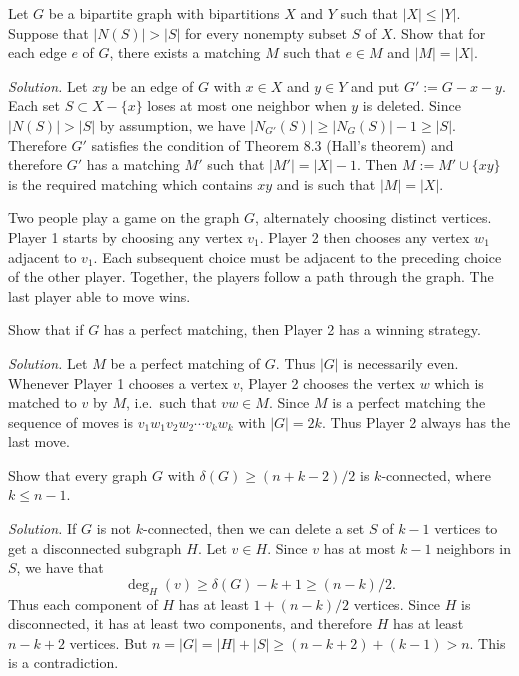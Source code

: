 \documentclass[10pt,reqno]{amsart}
\begin{document}
\begin{outline}[enumerate]
\medskip
\1 Let $G$ be a bipartite graph with bipartitions $X$ and $Y$ such that $|X|
\le |Y|$. Suppose that $|N(S)| > |S|$ for every nonempty subset $S$ of $X$.
Show that for each edge $e$ of $G$, there exists a matching $M$ such that $e\in
M$ and $|M| = |X|.$

\medskip
\noindent \emph{Solution.} Let $xy$ be an edge of $G$ with $x\in X$ and $y\in
Y$ and put $G' := G-x-y.$ Each set $S \subset X-\{x\}$ loses at most one
neighbor when $y$ is deleted. Since $|N(S)| > |S|$ by assumption, we have
$|N_{G'}(S)| \ge |N_G(S)|-1 \ge |S|.$ Therefore $G'$ satisfies the condition of
Theorem 8.3 (Hall's theorem) and therefore $G'$ has a matching $M'$ such that
$|M'| = |X|-1$. Then $M := M' \cup \{xy\}$ is the required matching which
contains $xy$ and is such that $|M| = |X|$.

\medskip
\1 Two people play a game on the graph $G$, alternately choosing distinct
vertices. Player 1 starts by choosing any vertex $v_1$. Player 2 then chooses
any vertex $w_1$ adjacent to $v_1$. Each subsequent choice must be adjacent to
the preceding choice of the other player. Together, the players follow a path
through the graph. The last player able to move wins.

Show that if $G$ has a perfect matching, then Player 2 has a winning strategy.

\medskip
\noindent \emph{Solution.} Let $M$ be a perfect matching of $G$. Thus $|G|$ is
necessarily even. Whenever Player 1 chooses a vertex $v$, Player 2 chooses the
vertex $w$ which is matched to $v$ by $M$, i.e.~such that $vw\in M$. Since $M$
is a perfect matching the sequence of moves is $v_1 w_1 v_2 w_2 \cdots v_k w_k$
with $|G| = 2k$. Thus Player 2 always has the last move.

\medskip
\1 Show that every graph $G$ with $\delta(G) \ge (n+k-2)/2$ is $k$-connected,
where $k \le n-1$.

\medskip
\noindent \emph{Solution.} If $G$ is not $k$-connected, then we can delete a
set $S$ of $k-1$ vertices to get a disconnected subgraph $H$. Let $v \in H$.
Since $v$ has at most $k-1$ neighbors in $S$, we have that \[\deg_{H}(v) \ge
\delta(G) - k + 1 \ge (n-k)/2.\] Thus each component of $H$ has at least
$1+(n-k)/2$ vertices. Since $H$ is disconnected, it has at least two
components, and therefore $H$ has at least $n-k+2$ vertices. But $n = |G| = |H|
+ |S| \ge (n-k+2) + (k-1) > n$. This is a contradiction.


\end{outline}
\end{document}
